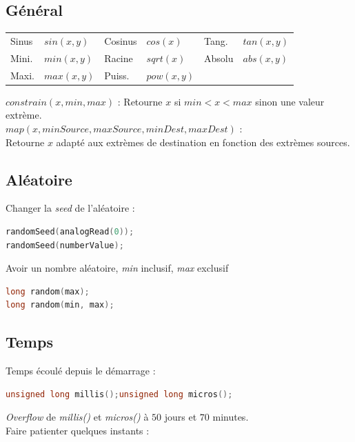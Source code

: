         \subsection{Général}
            \begin{center}
                \begin{tabular}{l l | l l | l l}
                    Sinus & $sin(x,y)$ & Cosinus & $cos(x) $ & Tang. & $tan(x,y)$\\
                    Mini. & $min(x,y)$ & Racine & $sqrt(x) $ & Absolu & $abs(x,y)$\\
                    Maxi. & $max(x,y)$ & Puiss. & $pow(x,y)$ & &\\
                \end{tabular}
            \end{center}

            \bmar
            $constrain(x, min, max)$ : Retourne $x$ si $min < x < max$ sinon une valeur extrème.\\
            $map(x, minSource, maxSource, minDest, maxDest)$ :\\Retourne $x$ adapté aux extrèmes de destination en fonction des extrèmes sources.
            \emar
        \subsection{Aléatoire}
            \bmar
                Changer la \textit{seed} de l'aléatoire :
            \emar
            \begin{lstlisting}[language=C]
randomSeed(analogRead(0));
randomSeed(numberValue);
            \end{lstlisting}

            \bmar
                Avoir un nombre aléatoire, \textit{min} inclusif, \textit{max} exclusif
            \emar
            \begin{lstlisting}[language=C]
long random(max);
long random(min, max);
            \end{lstlisting}

        \subsection{Temps}
            \bmar
            Temps écoulé depuis le démarrage :
            \emar
            \begin{lstlisting}[language=C]
unsigned long millis();unsigned long micros();
            \end{lstlisting}
            \bmar
                \textit{Overflow} de \textit{millis()} et \textit{micros()} à $50$ jours et $70$ minutes.\\
                Faire patienter quelques instants :

